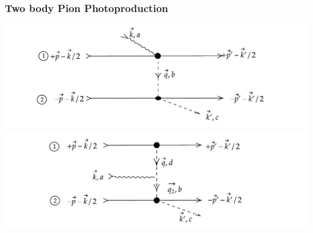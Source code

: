 \documentclass{beamer}
\DeclarePairedDelimiter\br{\langle}{\rvert}
\DeclarePairedDelimiter\kt{\lvert}{\rangle}
\begin{document}








\begin{frame}\frametitle{Two body Pion Photoproduction}
\begin{center}
\includegraphics[scale=0.6]{pionphoto-2A.pdf}\\
\includegraphics[scale=0.6]{pionphoto-2B.pdf}
\end{center}
\end{frame}
\end{document}
